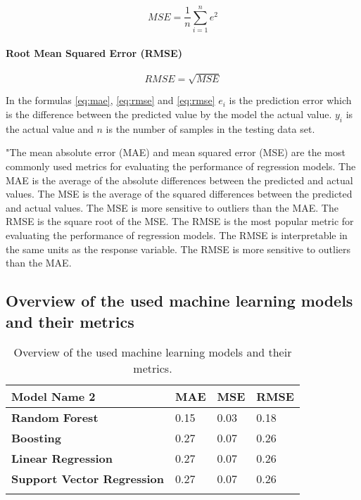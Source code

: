 \begin{equation}
    \label{eq:mse}
    MSE = \frac{1}{n} \sum_{i=1}^{n} e^2
\end{equation}

\paragraph*{Root Mean Squared Error (RMSE)}

\begin{equation}
    \label{eq:rmse}
    RMSE = \sqrt{MSE}
\end{equation}

In the formulas \ref{eq:mae}, \ref{eq:rmse} and \ref{eq:rmse} $e_i$ is the prediction error which is the difference between the predicted value by the model the actual value. 
$y_i$ is the actual value and $n$ is the number of samples in the testing data set.

"The mean absolute error (MAE) and mean squared error (MSE) are the most commonly used metrics for
evaluating the performance of regression models. The MAE is the average of the absolute differences between
the predicted and actual values. The MSE is the average of the squared differences between the predicted and
actual values. The MSE is more sensitive to outliers than the MAE. The RMSE is the square root of the MSE.
The RMSE is the most popular metric for evaluating the performance of regression models. The RMSE is
interpretable in the same units as the response variable. The RMSE is more sensitive to outliers than the MAE.


\subsection{Overview of the used machine learning models and their metrics}
\begin{longtable}{l|l|l|l}
    \textbf{Model Name 2} & \textbf{MAE} & \textbf{MSE} & \textbf{RMSE} \\
    \hline
    \textbf{Random Forest} & 0.15 & 0.03 & 0.18 \\
    \hline
    \textbf{Boosting} & 0.27 & 0.07 & 0.26 \\
    \hline
    \textbf{Linear Regression} & 0.27 & 0.07 & 0.26 \\
    \hline
    \textbf{Support Vector Regression} & 0.27 & 0.07 & 0.26 \\
    \hline
    \caption{Overview of the used machine learning models and their metrics.}
    \label{tab:ml_models}
\end{longtable}

